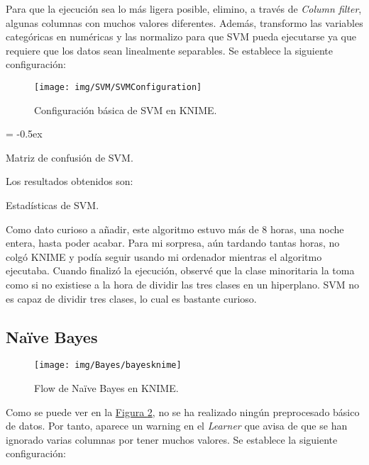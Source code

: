 \documentclass[paper=a4, fontsize=12pt]{article} %
\numberwithin{equation}{section} %
\numberwithin{figure}{section} %
\numberwithin{table}{section} %
\begin{document}
	Para que la ejecución sea lo más ligera posible, elimino, a través de \textit{Column filter}, algunas columnas con muchos valores diferentes. Además, transformo las variables categóricas en numéricas y las normalizo para que SVM pueda ejecutarse ya que requiere que los datos sean linealmente separables. Se establece la siguiente configuración:
	\begin{figure}[H]
	  \centering
	  \texttt{[image: img/SVM/SVMConfiguration]}
	  \caption{Configuración básica de SVM en KNIME.}
	  \label{config_SVMs}
	\end{figure}

	\extrarowheight = -0.5ex %
	\renewcommand{\arraystretch}{1.75} %
	\begin{table}[H]
		\begin{center}
		\end{center}
		\caption {Matriz de confusión de SVM.}
		\label {mcSVMs}
	\end{table}

	Los resultados obtenidos son:
	\begin{table}[H]
		\begin{center}
		\end{center}
		\caption {Estadísticas de SVM.}
		\label {statisticsSVMs}
	\end{table}

	Como dato curioso a añadir, este algoritmo estuvo más de 8 horas, una noche entera, hasta poder acabar. Para mi sorpresa, aún tardando tantas horas, no colgó KNIME y podía seguir usando mi ordenador mientras el algoritmo ejecutaba. Cuando finalizó la ejecución, observé que la clase minoritaria la toma como si no existiese a la hora de dividir las tres clases en un hiperplano. SVM no es capaz de dividir tres clases, lo cual es bastante curioso.

\subsection {Naïve Bayes}

	\begin{figure}[H]
	  \centering
	  \texttt{[image: img/Bayes/bayesknime]}
	  \caption{Flow de Naïve Bayes en KNIME.}
	  \label{flow_Bayess}
	\end{figure}

	Como se puede ver en la \hyperref[flow_Bayess]{Figura \ref*{flow_Bayess}}, no se ha realizado ningún preprocesado básico de datos. Por tanto, aparece un warning en el \textit{Learner} que avisa de que se han ignorado varias columnas por tener muchos valores. Se establece la siguiente configuración:
\end{document}
